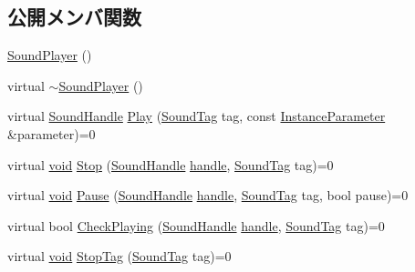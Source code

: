 \subsection*{公開メンバ関数}
\begin{DoxyCompactItemize}
\item 
\mbox{\hyperlink{class_effekseer_1_1_sound_player_a64593615152ced591b2b347fc7555d69}{Sound\+Player}} ()
\item 
virtual \mbox{\hyperlink{class_effekseer_1_1_sound_player_a93693b494f59c66a1a5e6a830fa4b62f}{$\sim$\+Sound\+Player}} ()
\item 
virtual \mbox{\hyperlink{namespace_effekseer_a694a300b9b688ca40f6a0d9841d437bf}{Sound\+Handle}} \mbox{\hyperlink{class_effekseer_1_1_sound_player_aaea571e89a22b2b0a8971bfb52176622}{Play}} (\mbox{\hyperlink{namespace_effekseer_adb219197297396cf2ab9bee657551a29}{Sound\+Tag}} tag, const \mbox{\hyperlink{struct_effekseer_1_1_sound_player_1_1_instance_parameter}{Instance\+Parameter}} \&parameter)=0
\item 
virtual \mbox{\hyperlink{namespace_effekseer_ab34c4088e512200cf4c2716f168deb56}{void}} \mbox{\hyperlink{class_effekseer_1_1_sound_player_af300227673261666ce202159054db9bb}{Stop}} (\mbox{\hyperlink{namespace_effekseer_a694a300b9b688ca40f6a0d9841d437bf}{Sound\+Handle}} \mbox{\hyperlink{namespace_effekseer_afd99b336b206999bdcca3e431648efbc}{handle}}, \mbox{\hyperlink{namespace_effekseer_adb219197297396cf2ab9bee657551a29}{Sound\+Tag}} tag)=0
\item 
virtual \mbox{\hyperlink{namespace_effekseer_ab34c4088e512200cf4c2716f168deb56}{void}} \mbox{\hyperlink{class_effekseer_1_1_sound_player_ae7dc7d8e0dca428ac9bde68cebb7fedf}{Pause}} (\mbox{\hyperlink{namespace_effekseer_a694a300b9b688ca40f6a0d9841d437bf}{Sound\+Handle}} \mbox{\hyperlink{namespace_effekseer_afd99b336b206999bdcca3e431648efbc}{handle}}, \mbox{\hyperlink{namespace_effekseer_adb219197297396cf2ab9bee657551a29}{Sound\+Tag}} tag, bool pause)=0
\item 
virtual bool \mbox{\hyperlink{class_effekseer_1_1_sound_player_a046be0da01c515b38b92d792108441b6}{Check\+Playing}} (\mbox{\hyperlink{namespace_effekseer_a694a300b9b688ca40f6a0d9841d437bf}{Sound\+Handle}} \mbox{\hyperlink{namespace_effekseer_afd99b336b206999bdcca3e431648efbc}{handle}}, \mbox{\hyperlink{namespace_effekseer_adb219197297396cf2ab9bee657551a29}{Sound\+Tag}} tag)=0
\item 
virtual \mbox{\hyperlink{namespace_effekseer_ab34c4088e512200cf4c2716f168deb56}{void}} \mbox{\hyperlink{class_effekseer_1_1_sound_player_a4726bc7f3f4049508a268f16a4beeb56}{Stop\+Tag}} (\mbox{\hyperlink{namespace_effekseer_adb219197297396cf2ab9bee657551a29}{Sound\+Tag}} tag)=0

\end{DoxyCompactItemize}
